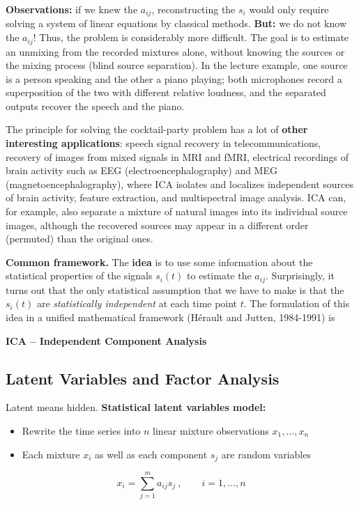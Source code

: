    \textbf {Observations:} if we knew the $a_{ij}$, reconstructing the $s_i$ would only require solving a system of linear equations by classical methods. \textbf{But:} we do not know the $a_{ij}$! Thus, the problem is considerably more difficult. The goal is to estimate an unmixing from the recorded mixtures alone, without knowing the sources or the mixing process (blind source separation). In the lecture example, one source is a person speaking and the other a piano playing; both microphones record a superposition of the two with different relative loudness, and the separated outputs recover the speech and the piano.
  
  The principle for solving the cocktail-party problem has a lot of \textbf {other interesting applications}: speech signal recovery in telecommunications, recovery of images from mixed signals in MRI and fMRI, electrical recordings of brain activity such as EEG (electroencephalography) and MEG (magnetoencephalography), where ICA isolates and localizes independent sources of brain activity, feature extraction, and multispectral image analysis. ICA can, for example, also separate a mixture of natural images into its individual source images, although the recovered sources may appear in a different order (permuted) than the original ones.

 \textbf{Common framework.}
 The \textbf {idea} is to use some information about the statistical properties of the signals $s_i(t)$ to estimate the $a_{ij}$. Surprisingly, it turns out that the only statistical assumption that we have to make is that the $s_i(t)$ are \textit{statistically independent} at each time point $t$.
 The formulation of this idea in a unified mathematical framework (H\'{e}rault and Jutten, 1984-1991) is
  \begin{center}
   \textbf {ICA -- Independent Component Analysis}
  \end{center}

\subsection{Latent Variables and Factor Analysis}

Latent means hidden. 
 \textbf {Statistical latent variables model:}
  \begin{itemize}
    \item Rewrite the time series into $n$ linear mixture observations $x_1, \ldots, x_n$            
    \item Each mixture $x_i$ as well as each component $s_j$ are random variables
  \end{itemize}
  \begin{displaymath}
    x_i = \sum_{j=1}^m a_{ij} s_j ~, \qquad i = 1,\ldots,n
  \end{displaymath}

